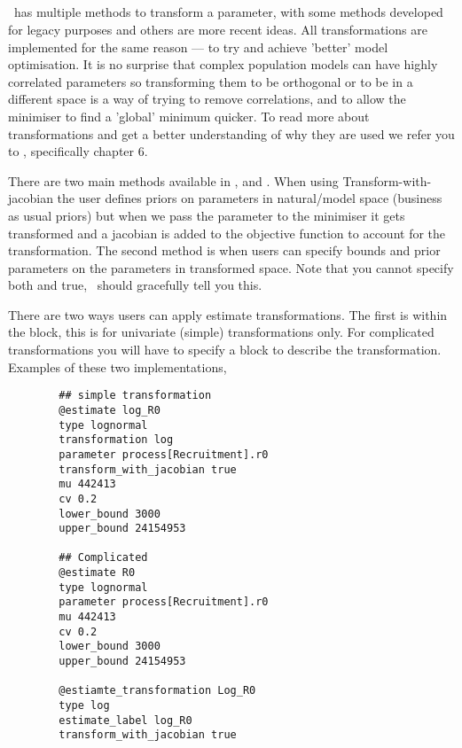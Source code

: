 \subsection{\label{sec:transformations}}
\CNAME\ has multiple methods to transform a parameter, with some methods developed for legacy purposes and others are more recent ideas. All transformations are implemented for the same reason --- to try and achieve 'better' model optimisation. It is no surprise that complex population models can have highly correlated parameters so transforming them to be orthogonal or to be in a different space is a way of trying to remove correlations, and to allow the minimiser to find a 'global' minimum quicker. To read more about transformations and get a better understanding of why they are used we refer you to \cite{gilks1995markov}, specifically chapter 6. 

There are two main methods available in \CNAME,  and . When using Transform-with-jacobian the user defines priors on parameters in natural/model space (business as usual priors) but when we pass the parameter to the minimiser it gets transformed and a jacobian is added to the objective function to account for the transformation. The second method is when users can specify bounds and prior parameters on the parameters in transformed space. Note that you cannot specify both  and  true, \CNAME\ should gracefully tell you this.

There are two ways users can apply estimate transformations. The first is within the  block, this is for univariate (simple) transformations only. For complicated transformations you will have to specify a  block to describe the transformation. Examples of these two implementations,

{\small{\begin{verbatim}
		## simple transformation
		@estimate log_R0
		type lognormal
		transformation log
		parameter process[Recruitment].r0
		transform_with_jacobian true
		mu 442413
		cv 0.2
		lower_bound 3000
		upper_bound 24154953
		
		## Complicated 
		@estimate R0
		type lognormal
		parameter process[Recruitment].r0		
		mu 442413
		cv 0.2
		lower_bound 3000
		upper_bound 24154953
		
		@estiamte_transformation Log_R0
		type log
		estimate_label log_R0
		transform_with_jacobian true	
		\end{verbatim}}}

